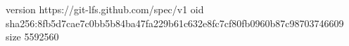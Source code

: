 version https://git-lfs.github.com/spec/v1
oid sha256:8fb5d7cae7c0bb5b84ba47fa229b61c632e8fc7cf80fb0960b87c98703746609
size 5592560
